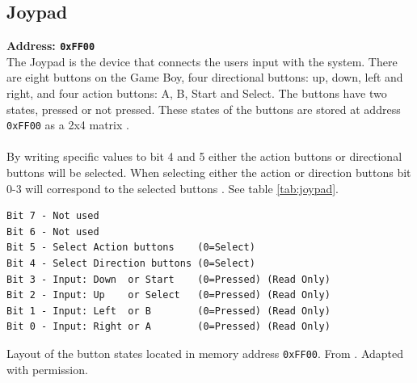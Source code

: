 



\subsection{Joypad}
\label{sec:Joypad}
\textbf{Address: \texttt{0xFF00}}
\\
The Joypad is the device that connects the users input with the system. 
There are eight buttons on the Game Boy, four directional buttons: up, down, left and right, and four action buttons: A, B, Start and Select.
The buttons have two states, pressed or not pressed. 
These states of the buttons are stored at address \texttt{0xFF00} as a 2x4 matrix \cite{pandocsjoypad}.
\\\\
By writing specific values to bit 4 and 5 either the action buttons or directional buttons will be selected.
When selecting either the action or direction buttons bit 0-3 will correspond to the selected buttons \cite{pandocsjoypad}. See table \ref{tab:joypad}.


\begin{table}[H]
    \begin{center}

\begin{BVerbatim}
Bit 7 - Not used
Bit 6 - Not used
Bit 5 - Select Action buttons    (0=Select)
Bit 4 - Select Direction buttons (0=Select)
Bit 3 - Input: Down  or Start    (0=Pressed) (Read Only)
Bit 2 - Input: Up    or Select   (0=Pressed) (Read Only)
Bit 1 - Input: Left  or B        (0=Pressed) (Read Only)
Bit 0 - Input: Right or A        (0=Pressed) (Read Only)
\end{BVerbatim}

    \caption{Layout of the button states located in memory address \texttt{0xFF00}. From \cite{pandocsjoypad}. Adapted with permission.}
    \label{tab:joypad}
    \end{center}
\end{table}

